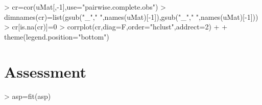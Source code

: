 \documentclass[shortnames,nojss,article]{jss}
\newenvironment{mylisting}
{\begin{list}{}{\setlength{\leftmargin}{1em}}\item\scriptsize\bfseries}
{\end{list}}
\begin{document}
\begin{mylisting}\begin{center}\begin{minipage}[H]{0.95\textwidth}\begin{shaded} 
\begin{Schunk}
\end{Schunk}
\end{shaded}\end{minipage}\end{center}\end{mylisting}

\begin{mylisting}\begin{center}\begin{minipage}[H]{0.95\textwidth}\begin{shaded} 
\begin{Schunk}
\begin{Sinput}
> cr=cor(uMat[,-1],use="pairwise.complete.obs")
> dimnames(cr)=list(gsub("_"," ",names(uMat)[-1]),gsub("_"," ",names(uMat)[-1]))
> cr[is.na(cr)]=0
> corrplot(cr,diag=F,order="hclust",addrect=2)  +          
+              theme(legend.position="bottom")  
\end{Sinput}
\end{Schunk}
\end{shaded}\end{minipage}\end{center}\end{mylisting}

\section{Assessment}


\begin{mylisting}\begin{center}\begin{minipage}[H]{0.95\textwidth}\begin{shaded} 
\begin{Schunk}
\begin{Sinput}
> asp=fit(asp)
\end{Sinput}
\end{Schunk}
\end{shaded}\end{minipage}\end{center}\end{mylisting}
\end{document}
